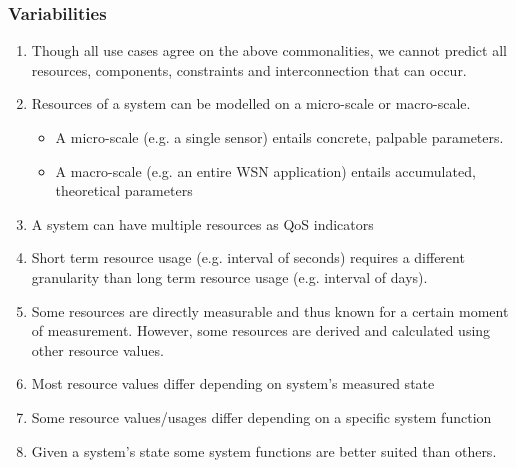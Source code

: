\subsubsection{Variabilities}
\begin{enumerate}[label=V\rdmid .\arabic*]
\nospace
\item \label{v:1obvious} Though all use cases agree on the above commonalities, we cannot predict all resources, components, constraints and interconnection that can occur.
\item \label{v:2micro_macro} Resources of a system can be modelled on a micro-scale or macro-scale.
\begin{itemize}
\nospace
\item A micro-scale (e.g. a single sensor) entails concrete, palpable parameters.
\item A macro-scale (e.g. an entire WSN application) entails accumulated, theoretical parameters
\end{itemize}
\item \label{v:3nr_optimizer} A system can have multiple resources as QoS indicators
\item \label{v:4granularity} Short term resource usage (e.g. interval of seconds) requires a different granularity than long term resource usage (e.g. interval of days).
\item \label{v:5measure_vs_derive} Some resources are directly measurable and thus known for a certain moment of measurement. However, some resources are derived and calculated using other resource values. \cite{feature_model}
\item \label{v:6state} Most resource values differ depending on system's measured state
\item \label{v:7function} Some resource values/usages differ depending on a specific system function
\item \label{v:8rum} Given a system's state some system functions are better suited than others.
\end{enumerate}

